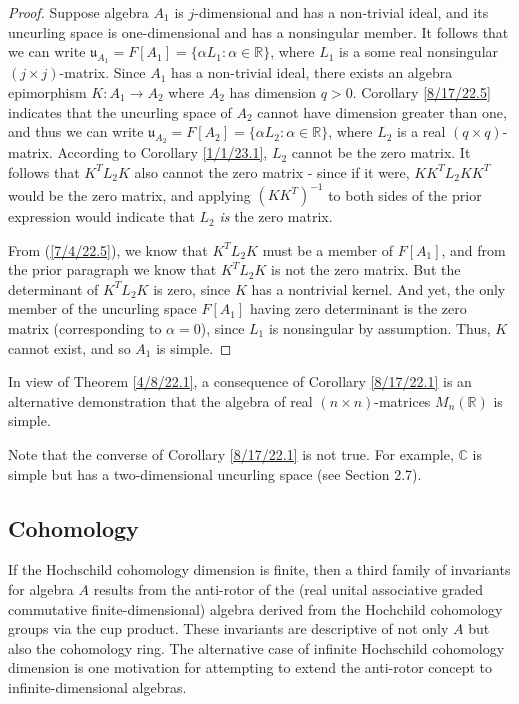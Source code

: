 \documentclass{amsart}
\numberwithin{equation}{section}
\theoremstyle{definition}
\numberwithin{theorem}{section}
\begin{document}
\begin{proof} Suppose algebra $A_1$ is $j$-dimensional and has a non-trivial ideal, and its uncurling space is one-dimensional and has a nonsingular member.  It follows that we can write $\mathfrak{u}_{A_1} = F[A_1] = \{\alpha L_1:\alpha\in \mathbb{R}\}$, where $L_1$ is a some real nonsingular $(j\times j)$-matrix.  Since $A_1$ has a non-trivial ideal, there exists an algebra epimorphism $K:A_1\rightarrow A_2$ where $A_2$ has dimension $q>0$.  Corollary \ref{8/17/22.5} indicates that the uncurling space of $A_2$ cannot have dimension greater than one, and thus we can write $\mathfrak{u}_{A_2} = F[A_2] = \{\alpha L_2:\alpha\in \mathbb{R}\}$, where $L_2$ is a real $(q\times q)$-matrix.  According to Corollary \ref{1/1/23.1}, $L_2$ cannot be the zero matrix. It follows that $K^T L_2 K$ also cannot the zero matrix - since if it were, $KK^T L_2 KK^T$ would be the zero matrix, and applying $(KK^T)^{-1}$ to both sides of the prior expression would indicate that $L_2$ {\it is} the zero matrix.  

From (\ref{7/4/22.5}), we know that $ K^T L_2 K$ must be a member of $F[A_1]$, and from the prior paragraph we know that $ K^T L_2 K$ is not the zero matrix.  But the determinant of $K^T L_2 K$ is zero, since $K$ has a  nontrivial kernel.  And yet, the only member of the uncurling space $F[A_1]$ having zero determinant is the zero matrix (corresponding to $\alpha=0$), since $L_1$ is nonsingular by assumption.   Thus, $K$ cannot exist, and so $A_1$ is simple. \end{proof}

In view of Theorem \ref{4/8/22.1}, a consequence of Corollary \ref{8/17/22.1} is an alternative demonstration that the algebra of real $(n\times n)$-matrices $ M_n(\mathbb{R})$ is simple.  

Note that the converse of Corollary \ref{8/17/22.1} is not true.  For example, $\mathbb{C}$ is simple but has a two-dimensional uncurling space (see Section 2.7).

\subsection{Cohomology} 
If the Hochschild cohomology dimension is finite, then a third family of invariants for algebra $A$ results from the anti-rotor of the (real unital associative graded commutative finite-dimensional) algebra derived from the Hochchild \mbox{cohomology} groups via the cup product.  These invariants are descriptive of not only $A$ but also the cohomology ring.  The alternative case of infinite Hochschild cohomology dimension is one motivation for attempting to extend the anti-rotor concept to infinite-dimensional algebras. 
\end{document}
